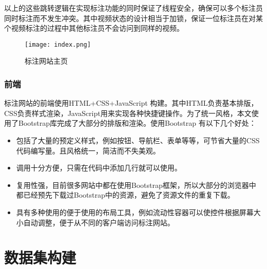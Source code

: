 以上的这些跳转逻辑在实现标注功能的同时保证了线程安全，确保可以多个标注员同时标注而不发生冲突。其中视频状态的设计相当于加锁，保证一位标注员在对某个视频标注的过程中其他标注员不会访问到同样的视频。

\begin{figure}[htbp]
    \centering
    \texttt{[image: index.png]}
    \caption{标注网站主页}
    \label{fig:anno_index}
\end{figure}
\subsubsection{前端}
标注网站的前端使用HTML+CSS+JavaScript 构建。其中HTML负责基本排版，CSS负责样式渲染，JavaScript用来实现各种快捷键操作。为了统一风格，本文使用了Bootstrap\cite{bootstrap}库完成了大部分的排版和渲染。使用Bootstrap 有以下几个好处：
\begin{itemize}
    \item 包括了大量的预定义样式，例如按钮、导航栏、表单等等，可节省大量的CSS代码编写量。且风格统一，简洁而不失美观。
    \item 调用十分方便，只需在代码中添加几行就可以使用。
    \item 复用性强，目前很多网站中都在使用Bootstrap框架，所以大部分的浏览器中都已经预先下载过Bootstrap中的资源，避免了资源文件的重复下载。
    \item 具有多种使用的便于使用的布局工具，例如流动性容器可以使控件根据屏幕大小自动调整，便于从不同的客户端访问标注网站。
\end{itemize}

\section{数据集构建}

